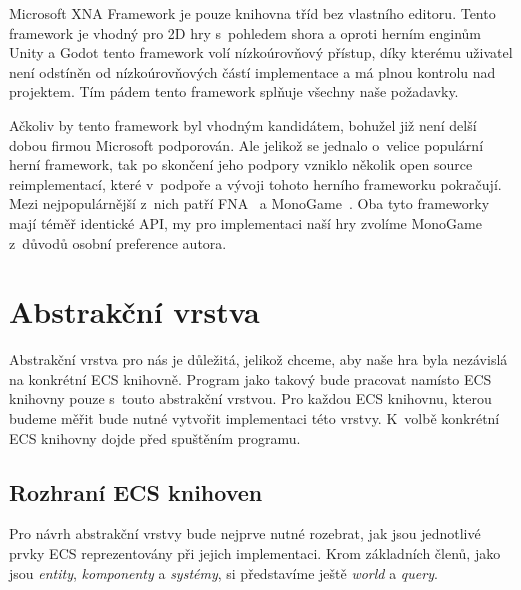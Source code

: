 Microsoft XNA Framework je pouze knihovna tříd bez vlastního editoru. Tento framework je vhodný pro 2D hry s~pohledem shora a oproti herním enginům Unity a Godot tento framework volí nízkoúrovňový přístup, díky kterému uživatel není odstíněn od nízkoúrovňových částí implementace a má plnou kontrolu nad projektem. Tím pádem tento framework splňuje všechny naše požadavky.

Ačkoliv by tento framework byl vhodným kandidátem, bohužel již není delší dobou firmou Microsoft podporován. Ale jelikož se jednalo o~velice populární herní framework, tak po skončení jeho podpory vzniklo několik open source reimplementací, které v~podpoře a vývoji tohoto herního frameworku pokračují. Mezi nejpopulárnější z~nich patří FNA~\cite{FNA} a MonoGame~\cite{MonoGame}. Oba tyto frameworky mají téměř identické API, my pro implementaci naší hry zvolíme MonoGame z~důvodů osobní preference autora.

\section{Abstrakční vrstva}
\label{section:abstract-layer-analysis}
Abstrakční vrstva pro nás je důležitá, jelikož chceme, aby naše hra byla nezávislá na konkrétní ECS knihovně. Program jako takový bude pracovat namísto ECS knihovny pouze s~touto abstrakční vrstvou. Pro každou ECS knihovnu, kterou budeme měřit bude nutné vytvořit implementaci této vrstvy. K~volbě konkrétní ECS knihovny dojde před spuštěním programu.

\subsection{Rozhraní ECS knihoven}
Pro návrh abstrakční vrstvy bude nejprve nutné rozebrat, jak jsou jednotlivé prvky ECS reprezentovány při jejich implementaci. Krom základních členů, jako jsou \textit{entity}, \textit{komponenty} a \textit{systémy}, si představíme ještě \textit{world} a \textit{query}.

